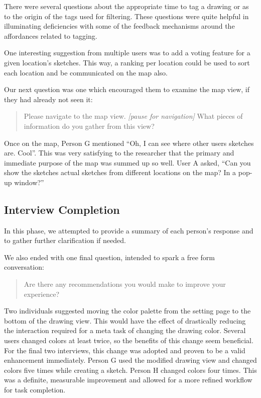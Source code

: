 \documentclass{www2010-submission}
\begin{document}
There were several questions about the appropriate time to tag a drawing or as
to the origin of the tags used for filtering.  These questions were quite
helpful in illuminating deficiencies with some of the feedback mechanisms
around the affordances related to tagging.

One interesting suggestion from multiple users was to add a voting feature for
a given location's sketches.  This way, a ranking per location could be used to
sort each location and be communicated on the map also.

Our next question was one which encouraged them to examine the map view, if
they had already not seen it:

\begin{quote}
Please navigate to the map view. {\it [pause for navigation]}
What pieces of information do you gather from this view?
\end{quote}

Once on the map, Person G mentioned ``Oh, I can see where other users sketches
are.  Cool''.  This was very satisfying to the researcher that the primary and
immediate purpose of the map was summed up so well.  User A asked, ``Can you 
show the sketches actual sketches from different locations on the map? In a
pop-up window?''


\subsection{Interview Completion}

In this phase, we attempted to provide a summary of each person's response and
to gather further clarification if needed.

We also ended with one final question, intended to spark a free form conversation:

\begin{quote}
Are there any recommendations you would make to improve your experience?
\end{quote}

Two individuals suggested moving the color palette from the setting page to the
bottom of the drawing view.  This would have the effect of drastically reducing
the interaction required for a meta task of changing the drawing color.  Several
users changed colors at least twice, so the benefits of this change seem
beneficial.  For the final two interviews, this change was adopted and proven
to be a valid enhancement immediately.  Person G used the modified drawing view
and changed colors five times while creating a sketch.  Person H changed colors
four times.  This was a definite, measurable improvement and allowed for a more
refined workflow for task completion.
\end{document}
